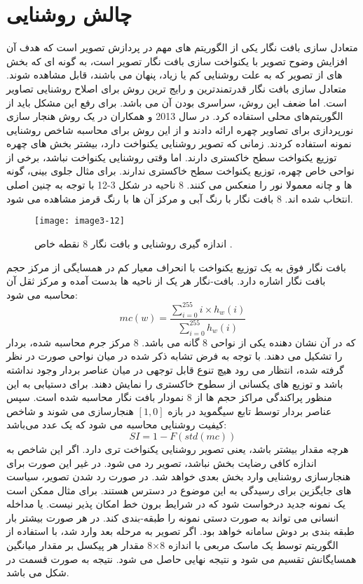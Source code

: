 \section{چالش روشنایی}
متعادل سازی بافت نگار یکی از الگوریتم های مهم در پردازش تصویر است که هدف آن افزایش وضوح تصویر با یکنواخت سازی بافت نگار تصویر است، به گونه ای که بخش های از تصویر که به علت روشنایی کم یا زیاد، پنهان می باشند، قابل مشاهده شوند. متعادل سازی بافت نگار قدرتمندترین و رایج ترین روش برای اصلاح روشنایی تصاویر است. اما ضعف این روش، سراسری بودن آن می باشد. برای رفع این مشکل باید از الگوریتم‌های محلی استفاده کرد.
\noindent
در سال 2013  و همکاران در \cite{6196234} یک روش هنجار سازی نورپردازی برای تصاویر چهره ارائه دادند و از این روش برای محاسبه شاخص روشنایی نمونه   استفاده کردند. زمانی که تصویر روشنایی یکنواخت دارد، بیشتر بخش های چهره توزیع یکنواخت سطح خاکستری دارند. اما وقتی روشنایی یکنواخت نباشد، برخی از نواحی خاص چهره، توزیع یکنواخت سطح خاکستری ندارند. برای مثال جلوی بینی، گونه ها و چانه معمولا نور را منعکس می کنند. 8 ناحیه در شکل 3-12 با توجه به چنین اصلی انتخاب شده اند. 8 بافت نگار با رنگ آبی و مرکز آن ها با رنگ قرمز مشاهده می شود.
\begin{figure}[h]
\centering
  \texttt{[image: image3-12]}
  \caption{اندازه گیری روشنایی و بافت نگار 8 نقطه خاص \cite{ref1}.}
  \label{image2-1}
\end{figure}
 بافت نگار فوق به یک توزیع یکنواخت با انحراف معیار کم در همسایگی از مرکز حجم بافت نگار اشاره دارد. بافت-نگار هر یک از ناحیه ها بدست آمده و مرکز ثقل آن محاسبه می شود:
\begin{equation}\label{eq3-9}
mc\left(w\right)=\frac{\sum_{i=0}^{255}{i\times h_w(i)}}{\sum_{i=0}^{255}{h_w(i)}}		
\end{equation}
\noindent
که در آن  نشان دهنده یکی از نواحی 8 گانه می باشد. 8 مرکز جرم محاسبه شده، بردار  را تشکیل می دهند. با توجه به فرض تشابه ذکر شده در میان نواحی صورت در نظر گرفته شده، انتظار می رود هیچ تنوع قابل توجهی در میان عناصر بردار وجود نداشته باشد و توزیع های یکسانی از سطوح خاکستری را نمایش دهند. برای دستیابی به این منظور پراکندگی مراکز حجم ها از 8 نمودار بافت نگار محاسبه شده است. سپس عناصر بردار  توسط تابع سیگموید  در بازه
$[1,0]$
هنجارسازی می شوند و شاخص کیفیت روشنایی محاسبه می شود که یک عدد می‌باشد:
\begin{equation}\label{eq3-10}
SI=1-F(std\left(mc\right))	
\end{equation}
\noindent
هرچه مقدار  بیشتر باشد، یعنی تصویر روشنایی یکنواخت تری دارد. اگر این شاخص به اندازه کافی رضایت بخش نباشد، تصویر رد می شود. در غیر این صورت برای هنجارسازی روشنایی وارد بخش بعدی خواهد شد. در صورت رد شدن تصویر، سیاست های جایگزین برای رسیدگی به این موضوع در دسترس هستند. برای مثال ممکن است یک نمونه جدید درخواست شود که در شرایط برون خط امکان پذیر نیست. یا مداخله انسانی می تواند به صورت دستی نمونه را طبقه-بندی کند. در هر صورت بیشتر بار طبقه بندی بر دوش سامانه خواهد بود. اگر تصویر به مرحله بعد وارد شد، با استفاده از الگوریتم  توسط یک ماسک مربعی با اندازه 8×8 مقدار هر پیکسل بر مقدار میانگین همسایگانش تقسیم می شود و نتیجه نهایی حاصل می شود. نتیجه به صورت قسمت  در شکل  می باشد.
